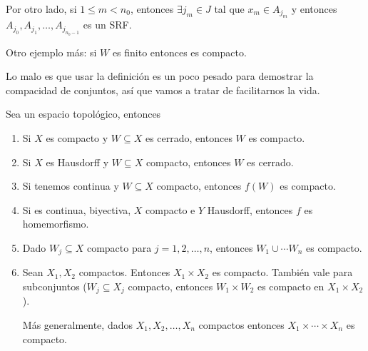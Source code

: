 \documentclass{apuntes}
\begin{document}
Por otro lado, si $1≤m<n_0$, entonces $∃j_m∈J$ tal que $x_m∈A_{j_m}$ y entonces $A_{j_0}, A_{j_1}, \dotsc, A_{j_{n_0-1}}$ es un SRF.

Otro ejemplo más: si $W$ es finito entonces es compacto.

Lo malo es que usar la definición es un poco pesado para demostrar la compacidad de conjuntos, así que vamos a tratar de facilitarnos la vida.

\begin{prop} Sea \tops un espacio topológico, entonces
\begin{enumerate}
	\item Si $X$ es compacto y $W⊆X$ es cerrado, entonces $W$ es compacto.
	\item Si $X$ es Hausdorff y $W⊆X$ compacto, entonces $W$ es cerrado.
	\item Si tenemos \stdf continua y $W⊆X$ compacto, entonces $f(W)$ es compacto.
	\item Si \stdf es continua, biyectiva, $X$ compacto e $Y$ Hausdorff, entonces $f$ es homemorfismo.
	\item Dado $W_j⊆X$ compacto para $j=1,2,\dotsc, n$, entonces $W_1 ∪ \dotsb W_n$ es compacto.
	\item Sean $X_1, X_2$ compactos. Entonces $X_1×X_2$ es compacto. También vale para subconjuntos ($W_j ⊆ X_j$ compacto, entonces $W_1 × W_2$ es compacto en $X_1×X_2$).

	Más generalmente, dados $X_1,X_2,\dotsc, X_n$ compactos entonces $X_1 × \dotsb × X_n$ es compacto.
\end{enumerate}
\end{prop}
\end{document}
